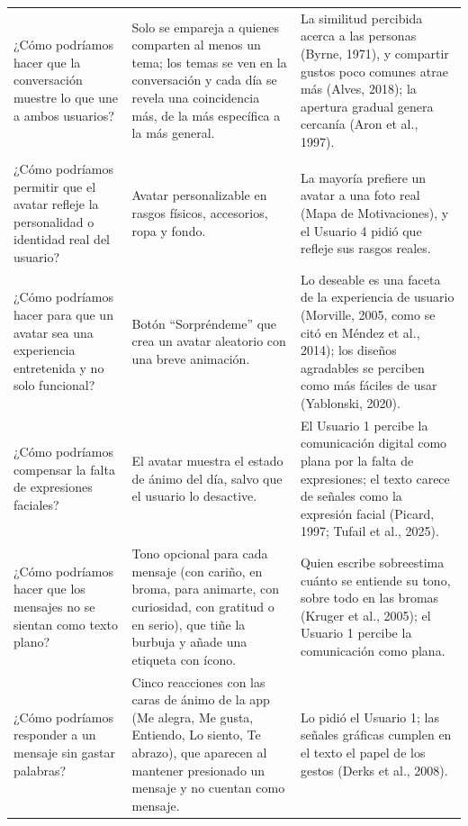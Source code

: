 \begin{longtable}{
  >{\raggedright\arraybackslash}p{}
  >{\raggedright\arraybackslash}p{}
  >{\raggedright\arraybackslash}p{}
}
¿Cómo podríamos hacer que la conversación muestre lo que une a ambos usuarios?
&
Solo se empareja a quienes comparten al menos un tema; los temas se ven en la conversación y cada día se revela una coincidencia más, de la más específica a la más general.
&
La similitud percibida acerca a las personas (Byrne, 1971), y compartir gustos poco comunes atrae más (Alves, 2018); la apertura gradual genera cercanía (Aron et al., 1997). \\[6pt]

\addlinespace[4pt]
\multicolumn{3}{l}{\textbf{Conocimiento: Preferencia por un avatar en vez de una foto real}} \\[4pt]
¿Cómo podríamos permitir que el avatar refleje la personalidad o identidad real del usuario?
&
Avatar personalizable en rasgos físicos, accesorios, ropa y fondo.
&
La mayoría prefiere un avatar a una foto real (Mapa de Motivaciones), y el Usuario 4 pidió que refleje sus rasgos reales. \\[6pt]

¿Cómo podríamos hacer para que un avatar sea una experiencia entretenida y no solo funcional?
&
Botón ``Sorpréndeme'' que crea un avatar aleatorio con una breve animación.
&
Lo deseable es una faceta de la experiencia de usuario (Morville, 2005, como se citó en Méndez et al., 2014); los diseños agradables se perciben como más fáciles de usar (Yablonski, 2020). \\[6pt]

¿Cómo podríamos compensar la falta de expresiones faciales?
&
El avatar muestra el estado de ánimo del día, salvo que el usuario lo desactive.
&
El Usuario 1 percibe la comunicación digital como plana por la falta de expresiones; el texto carece de señales como la expresión facial (Picard, 1997; Tufail et al., 2025). \\[6pt]

¿Cómo podríamos hacer que los mensajes no se sientan como texto plano?
&
Tono opcional para cada mensaje (con cariño, en broma, para animarte, con curiosidad, con gratitud o en serio), que tiñe la burbuja y añade una etiqueta con ícono.
&
Quien escribe sobreestima cuánto se entiende su tono, sobre todo en las bromas (Kruger et al., 2005); el Usuario 1 percibe la comunicación como plana. \\[6pt]

¿Cómo podríamos responder a un mensaje sin gastar palabras?
&
Cinco reacciones con las caras de ánimo de la app (Me alegra, Me gusta, Entiendo, Lo siento, Te abrazo), que aparecen al mantener presionado un mensaje y no cuentan como mensaje.
&
Lo pidió el Usuario 1; las señales gráficas cumplen en el texto el papel de los gestos (Derks et al., 2008). \\[6pt]


\end{longtable}
